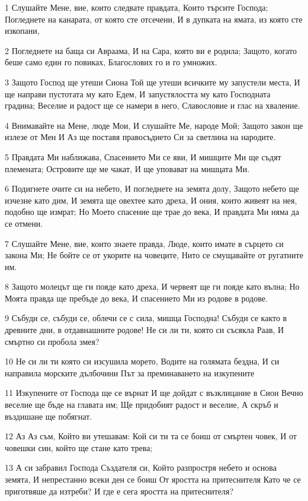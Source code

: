 \par 1 Слушайте Мене, вие, които следвате правдата, Които търсите Господа; Погледнете на канарата, от която сте отсечени, И в дупката на ямата, из която сте изкопани,
\par 2 Погледнете на баща си Авраама, И на Сара, която ви е родила; Защото, когато беше само един го повиках, Благослових го и го умножих.
\par 3 Защото Господ ще утеши Сиона Той ще утеши всичките му запустели места, И ще направи пустотата му като Едем, И запустялостта му като Господната градина; Веселие и радост ще се намери в него, Славословие и глас на хваление.
\par 4 Внимавайте на Мене, люде Мои, И слушайте Ме, народе Мой; Защото закон ще излезе от Мен И Аз ще поставя правосъдието Си за светлина на народите.
\par 5 Правдата Ми наближава, Спасението Ми се яви, И мишците Ми ще съдят племената; Островите ще ме чакат, И ще уповават на мишцата Ми.
\par 6 Подигнете очите си на небето, И погледнете на земята долу, Защото небето ще изчезне като дим, И земята ще овехтее като дреха, И ония, които живеят на нея, подобно ще измрат; Но Моето спасение ще трае до века, И правдата Ми няма да се отмени.
\par 7 Слушайте Мене, вие, които знаете правда, Люде, които имате в сърцето си закона Ми; Не бойте се от укорите на човеците, Нито се смущавайте от ругатните им.
\par 8 Защото молецът ще ги пояде като дреха, И червеят ще ги пояде като вълна; Но Моята правда ще пребъде до века, И спасението Ми из родове в родове.
\par 9 Събуди се, събуди се, облечи се с сила, мишца Господна! Събуди се както в древните дни, в отдавнашните родове! Не си ли ти, която си съсякла Раав, И смъртно си пробола змея?
\par 10 Не си ли ти която си изсушила морето, Водите на голямата бездна, И си направила морските дълбочини Път за преминаването на изкупените
\par 11 Изкупените от Господа ще се върнат И ще дойдат с възклицание в Сион Вечно веселие ще бъде на главата им; Ще придобият радост и веселие, А скръб и въздишане ще побягнат.
\par 12 Аз Аз съм, Който ви утешавам: Кой си ти та се боиш от смъртен човек, И от човешки син, който ще стане като трева;
\par 13 А си забравил Господа Създателя си, Който разпростря небето и основа земята, И непрестанно всеки ден се боиш От яростта на притеснителя Като че се приготвяше да изтреби? И где е сега яростта на притеснителя?
